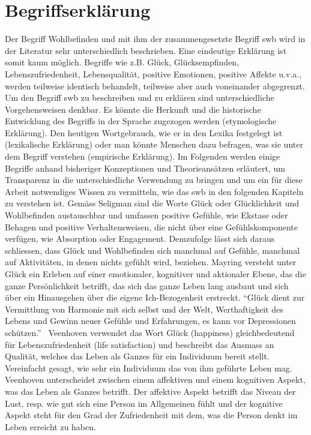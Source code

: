 \section{Begriffserklärung}\label{begriff}
Der Begriff Wohlbefinden und mit ihm der zusammengesetzte Begriff \gls{swb} wird in der Literatur sehr unterschiedlich beschrieben. Eine eindeutige Erklärung ist somit kaum möglich. Begriffe wie z.B. Glück, Glücksempfinden, Lebenszufriedenheit, Lebensqualität, positive Emotionen, positive Affekte u.v.a., werden teilweise identisch behandelt, teilweise aber auch voneinander abgegrenzt. Um den Begriff \gls{swb} zu beschreiben und zu erklären sind unterschiedliche Vorgehensweisen denkbar. Es könnte die Herkunft und die historische Entwicklung des Begriffs in der Sprache zugezogen werden (etymologische Erklärung). Den heutigen Wortgebrauch, wie er in den Lexika festgelegt ist (lexikalische Erklärung) oder man könnte Menschen dazu befragen, was sie unter dem Begriff verstehen (empirische Erklärung). 
Im Folgenden werden einige Begriffe anhand bisheriger Konzeptionen und Theorieansätzen erläutert, um Transparenz in die unterschiedliche Verwendung zu bringen und um ein für diese Arbeit notwendiges Wissen zu vermitteln, wie das \gls{swb} in den folgenden Kapiteln zu verstehen ist.\newline
Gemäss Seligman  \cite{Seligman:2003} sind die Worte Glück oder Glücklichkeit und Wohlbefinden austauschbar und umfassen positive Gefühle, wie Ekstase oder Behagen und positive Verhaltensweisen, die nicht über eine Gefühlskomponente verfügen, wie Absorption oder Engagement. Demzufolge lässt sich daraus schliessen, dass Glück und Wohlbefinden sich manchmal auf Gefühle, manchmal auf Aktivitäten, in denen nichts gefühlt wird, beziehen.\newline
Mayring \cite{Mayring:1991} versteht unter Glück ein Erleben auf einer emotionaler, kognitiver und aktionaler Ebene, das die ganze Persönlichkeit betrifft, das sich das ganze Leben lang ausbaut und sich über ein Hinausgehen über die eigene Ich-Bezogenheit erstreckt. \textquotedblleft Glück dient zur Vermittlung von Harmonie mit sich selbst und der Welt, Werthaftigkeit des Lebens und Gewinn neuer Gefühle und Erfahrungen, es kann vor Depressionen schützen.\textquotedblright \ \cite{Mayring:1991} \newline
Veenhoven \cite{Veenhoven:1991} verwendet das Wort Glück (happiness) gleichbedeutend für Lebenszufriedenheit (life satisfaction) und beschreibt das Ausmass an Qualität, welches das Leben als Ganzes für ein Individuum bereit stellt. Vereinfacht gesagt, wie sehr ein Individuum das von ihm geführte Leben mag. Veenhoven unterscheidet zwischen einem affektiven und einem kognitiven Aspekt, was das Leben als Ganzes betrifft. Der affektive Aspekt betrifft das Niveau der Lust, resp. wie gut sich eine Person im Allgemeinen fühlt  und der kognitive Aspekt steht für den Grad der Zufriedenheit mit dem, was die Person denkt im Leben erreicht zu haben.\newline
